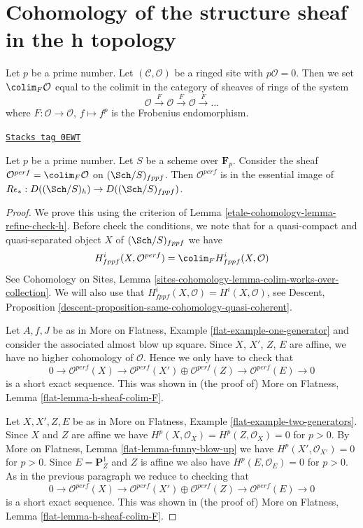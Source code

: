 \section{Cohomology of the structure sheaf in the h topology}
\label{etale-cohomology-section-cohomology-O-h}
Let $p$ be a prime number. Let $(\mathcal{C}, \mathcal{O})$ be a ringed site
with $p\mathcal{O} = 0$. Then we set $\colim_F \mathcal{O}$
equal to the colimit in the category of sheaves of rings of the system
$$
\mathcal{O} \xrightarrow{F} \mathcal{O} \xrightarrow{F}
\mathcal{O} \xrightarrow{F} \ldots
$$
where $F : \mathcal{O} \to \mathcal{O}$, $f \mapsto f^p$
is the Frobenius endomorphism.

\begin{lemma}
\label{etale-cohomology-lemma-h-sheaf-colim-F}
\href{https://stacks.math.columbia.edu/tag/0EWT}{\texttt{Stacks tag 0EWT}}

Let $p$ be a prime number. Let $S$ be a scheme over $\mathbf{F}_p$.
Consider the sheaf $\mathcal{O}^{perf} = \colim_F \mathcal{O}$
on $(\Sch/S)_{fppf}$. Then $\mathcal{O}^{perf}$ is in the essential
image of $R\epsilon_* : D((\Sch/S)_h) \to D((\Sch/S)_{fppf})$.
\end{lemma}

\begin{proof}
We prove this using the criterion of Lemma \ref{etale-cohomology-lemma-refine-check-h}.
Before check the conditions, we note that for a
quasi-compact and quasi-separated object $X$ of
$(\Sch/S)_{fppf}$ we have
$$
H^i_{fppf}(X, \mathcal{O}^{perf}) = \colim_F H^i_{fppf}(X, \mathcal{O})
$$
See Cohomology on Sites,
Lemma \ref{sites-cohomology-lemma-colim-works-over-collection}.
We will also use that $H^i_{fppf}(X, \mathcal{O}) = H^i(X, \mathcal{O})$, see
Descent, Proposition \ref{descent-proposition-same-cohomology-quasi-coherent}.

\medskip\noindent
Let $A, f, J$ be as in
More on Flatness, Example \ref{flat-example-one-generator}
and consider the associated almost blow up square.
Since $X$, $X'$, $Z$, $E$ are affine, we have no
higher cohomology of $\mathcal{O}$. Hence we only
have to check that
$$
0 \to
\mathcal{O}^{perf}(X) \to
\mathcal{O}^{perf}(X') \oplus \mathcal{O}^{perf}(Z) \to
\mathcal{O}^{perf}(E) \to 0
$$
is a short exact sequence. This was shown in (the proof of)
More on Flatness, Lemma \ref{flat-lemma-h-sheaf-colim-F}.

\medskip\noindent
Let $X, X', Z, E$ be as in
More on Flatness, Example \ref{flat-example-two-generators}.
Since $X$ and $Z$ are affine we have
$H^p(X, \mathcal{O}_X) = H^p(Z, \mathcal{O}_X) = 0$ for $p > 0$.
By More on Flatness, Lemma \ref{flat-lemma-funny-blow-up}
we have $H^p(X', \mathcal{O}_{X'}) = 0$ for $p > 0$.
Since $E = \mathbf{P}^1_Z$ and $Z$ is affine we also have
$H^p(E, \mathcal{O}_E) = 0$ for $p > 0$. As in the previous
paragraph we reduce to checking that
$$
0 \to
\mathcal{O}^{perf}(X) \to
\mathcal{O}^{perf}(X') \oplus \mathcal{O}^{perf}(Z) \to
\mathcal{O}^{perf}(E) \to 0
$$
is a short exact sequence. This was shown in (the proof of)
More on Flatness, Lemma \ref{flat-lemma-h-sheaf-colim-F}.
\end{proof}

